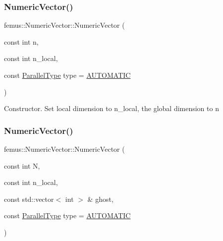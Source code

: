 \subsubsection{\texorpdfstring{Numeric\+Vector()}{NumericVector()}\hspace{0.1cm}{\footnotesize\ttfamily [3/4]}}
{\footnotesize\ttfamily femus\+::\+Numeric\+Vector\+::\+Numeric\+Vector (\begin{DoxyParamCaption}\item[{const int}]{n,  }\item[{const int}]{n\+\_\+local,  }\item[{const \mbox{\hyperlink{_paralleltype_enum_8hpp_a55f694af2ca20b6481914237cf7e567c}{Parallel\+Type}}}]{type = {\ttfamily \mbox{\hyperlink{_paralleltype_enum_8hpp_a55f694af2ca20b6481914237cf7e567ca0a831c2bc18e8354fe3e30ec0f3cdcda}{A\+U\+T\+O\+M\+A\+T\+IC}}} }\end{DoxyParamCaption})\hspace{0.3cm}{\ttfamily [inline]}}

Constructor. Set local dimension to {\ttfamily n\+\_\+local}, the global dimension to {\ttfamily n} \mbox{\label{classfemus_1_1_numeric_vector_abe38bc0d5251fdeddd0db1e7639d8d2a}} 
\subsubsection{\texorpdfstring{Numeric\+Vector()}{NumericVector()}\hspace{0.1cm}{\footnotesize\ttfamily [4/4]}}
{\footnotesize\ttfamily femus\+::\+Numeric\+Vector\+::\+Numeric\+Vector (\begin{DoxyParamCaption}\item[{const int}]{N,  }\item[{const int}]{n\+\_\+local,  }\item[{const std\+::vector$<$ int $>$ \&}]{ghost,  }\item[{const \mbox{\hyperlink{_paralleltype_enum_8hpp_a55f694af2ca20b6481914237cf7e567c}{Parallel\+Type}}}]{type = {\ttfamily \mbox{\hyperlink{_paralleltype_enum_8hpp_a55f694af2ca20b6481914237cf7e567ca0a831c2bc18e8354fe3e30ec0f3cdcda}{A\+U\+T\+O\+M\+A\+T\+IC}}} }\end{DoxyParamCaption})\hspace{0.3cm}{\ttfamily [inline]}}

